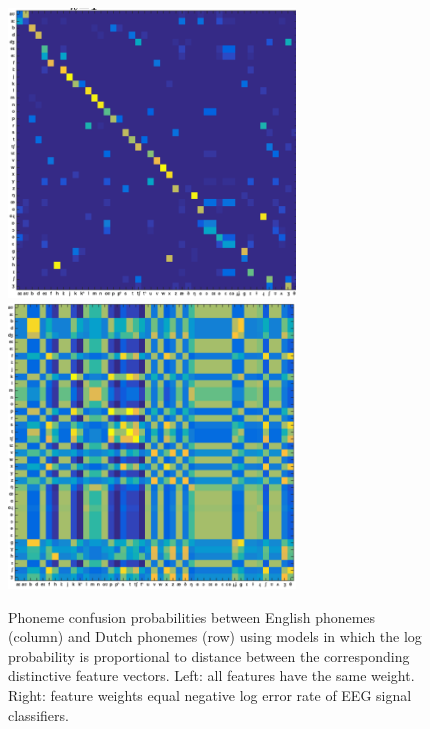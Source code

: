 \begin{figure}
  \centerline{
    \includegraphics[width=3in]{../figs/mirbagheri_dist_features.png}
    \includegraphics[width=3in]{../figs/mirbagheri_dist_eeg.png}
  }
  \caption{Phoneme confusion probabilities between English phonemes
    (column) and Dutch phonemes (row) using models in which the log
    probability is proportional to distance between the corresponding
    distinctive feature vectors.  Left: all features have the same
    weight.  Right: feature weights equal negative log error rate of
    EEG signal classifiers.}
  \label{fig:eeg_confusions}
\end{figure}
